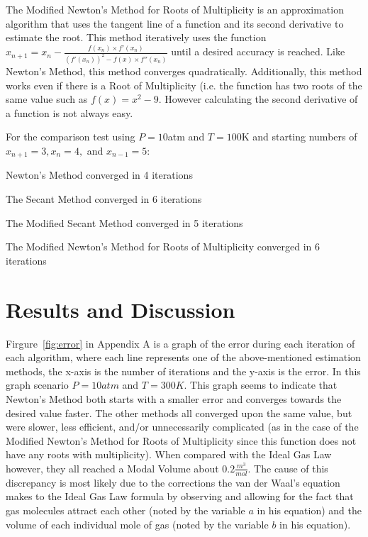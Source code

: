 \documentclass[12pt, letterpaper]{article}
\begin{document}
	The Modified Newton's Method for Roots of Multiplicity is an approximation algorithm that uses the tangent line of a function and its second derivative to estimate the root. This method iteratively uses the function $x_{n+1}=x_n-\frac{f(x_n)\times f'(x_n)}{(f'(x_n))^2-f(x)\times f''(x_n)}$ until a desired accuracy is reached. Like Newton's Method, this method converges quadratically. Additionally, this method works even if there is a Root of Multiplicity (i.e. the function has two roots of the same value such as $f(x)=x^2-9$. However calculating the second derivative of a function is not always easy.
	
	For the comparison test using $P=10$atm and $T=100$K and starting numbers of $x_{n+1}=3, x_n=4,$ and $x_{n-1}=5$:
	
	\begin{center}
		Newton's Method converged in 4 iterations
		
		The Secant Method converged in 6 iterations
		
		The Modified Secant Method converged in 5 iterations
		
		The Modified Newton's Method for Roots of Multiplicity converged in 6 iterations
	\end{center}

\section{Results and Discussion}
    	Firgure~\ref{fig:error} in Appendix A is a graph of the error during each iteration of each algorithm, where each line represents one of the above-mentioned estimation methods, the x-axis is the number of iterations and the y-axis is the error. In this graph scenario $P=10atm$ and $T=300K$. This graph seems to indicate that Newton's Method both starts with a smaller error and converges towards the desired value faster. The other methods all converged upon the same value, but were slower, less efficient, and/or unnecessarily complicated (as in the case of the Modified Newton's Method for Roots of Multiplicity since this function does not have any roots with multiplicity). When compared with the Ideal Gas Law however, they all reached a Modal Volume about $0.2\frac{m^3}{mol}$. The cause of this discrepancy is most likely due to the corrections the van der Waal's equation makes to the Ideal Gas Law formula by observing and allowing for the fact that gas molecules attract each other (noted by the variable $a$ in his equation) and the volume of each individual mole of gas (noted by the variable $b$ in his equation).
	
\end{document}
